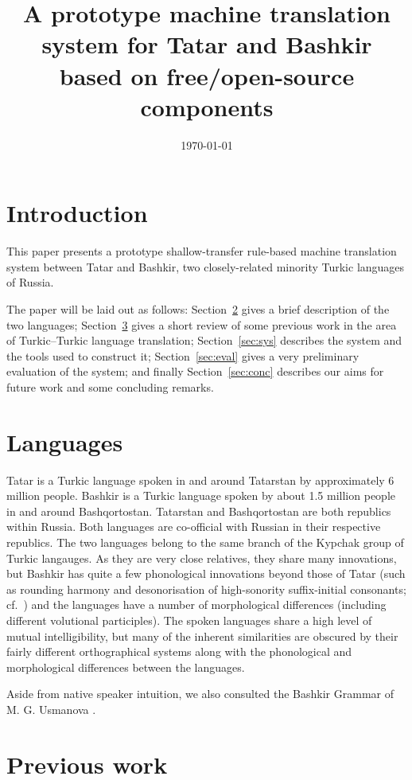 \documentclass[11pt,a4paper]{article}
\title{A prototype machine translation system for Tatar and Bashkir based on 
   free/open-source components}
\date{\today}
\begin{document}
\maketitleabstract

\section{Introduction}

This paper presents a prototype shallow-transfer rule-based machine translation
system between Tatar and Bashkir, two closely-related minority Turkic 
languages of Russia. 

The paper will be laid out as follows: Section~\ref{sec:lang} gives a brief description
of the two languages; Section~\ref{sec:prev} gives a short review of some previous
work in the area of Turkic--Turkic language translation; Section~\ref{sec:sys} 
describes the system and the tools used to construct it; Section~\ref{sec:eval}
gives a very preliminary evaluation of the system; and finally Section~\ref{sec:conc}
describes our aims for future work and some concluding remarks.

\section{Languages}
\label{sec:lang}

Tatar is a Turkic language spoken in and around Tatarstan by approximately 6 million people.  Bashkir is a Turkic language spoken by about 1.5 million people in and around Bashqortostan.  Tatarstan and Bashqortostan are both republics within Russia.  Both languages are co-official with Russian in their respective republics.  The two languages belong to the same branch of the Kypchak group of Turkic langauges.  As they are very close relatives, they share many innovations, but Bashkir has quite a few phonological innovations beyond those of Tatar (such as rounding harmony and desonorisation of high-sonority suffix-initial consonants; cf.\ \cite{washington10}) and the languages have a number of morphological differences (including different volutional participles).  The spoken languages share a high level of mutual intelligibility, but many of the inherent similarities are obscured by their fairly different orthographical systems along with the phonological and morphological differences between the languages.

Aside from native speaker intuition, we also consulted the Bashkir Grammar of M. G. Usmanova \cite{usmanova06}.

\section{Previous work}
\label{sec:prev}
\end{document}
